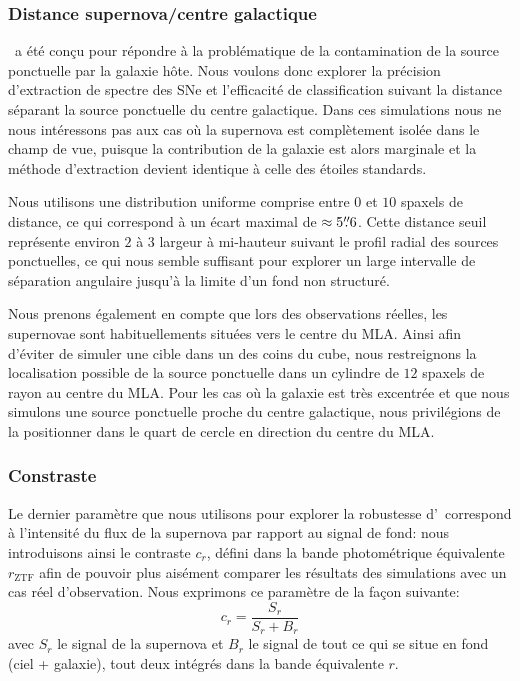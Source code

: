 \documentclass[../main/main.tex]{subfiles}
\begin{document}
\subsubsection{Distance supernova/centre galactique}\label{ssec:distancesimu}

\hypergal\ a été conçu pour répondre à la problématique de la
contamination de la source ponctuelle par la galaxie hôte. Nous voulons donc explorer la
précision d'extraction de spectre des SNe et l'efficacité de
classification suivant la distance séparant la source ponctuelle du
centre galactique. Dans ces simulations nous ne nous intéressons pas aux
cas où la supernova est complètement isolée dans le champ de vue,
puisque la contribution de la galaxie est alors marginale et
la méthode d'extraction devient identique à celle des étoiles standards.

Nous utilisons une distribution uniforme comprise entre $0$ et $10$
spaxels de distance, ce qui correspond à un écart maximal de
$\approx5\overset{\prime\prime}{.}6$. Cette distance seuil représente environ $2$ à $3$ largeur à
mi-hauteur suivant le profil radial des sources ponctuelles, ce qui nous
semble suffisant pour explorer un large intervalle de séparation
angulaire jusqu'à la limite d'un fond non structuré. 

Nous prenons également en compte que lors des observations réelles, les
supernovae sont habituellements situées vers le centre du MLA. Ainsi
afin d'éviter de simuler une cible dans un des coins du cube, nous
restreignons la localisation possible de la source ponctuelle dans un
cylindre de $12$ spaxels de rayon au centre du MLA. Pour les cas où la
galaxie est très excentrée et que nous simulons une source ponctuelle
proche du centre galactique, nous privilégions de la positionner dans le
quart de cercle en direction du centre du MLA. 

\subsubsection{Constraste}

Le dernier paramètre que nous utilisons pour explorer la robustesse
d'\hypergal\ correspond à l'intensité du flux de la supernova par
rapport au signal de fond: nous introduisons ainsi le
contraste $c_{r}$, défini dans la bande photométrique équivalente $r_{\text{ZTF}}$
afin de pouvoir plus aisément comparer les résultats des simulations
avec un cas réel d'observation. Nous exprimons ce paramètre de la façon suivante:
\begin{equation}
  \label{eq:contrast}
  c_{r} = \frac{S_{r}}{S_{r}+B_{r}}
\end{equation}
avec $S_{r}$ le signal de la supernova et $B_{r}$ le signal de tout ce qui se
situe en fond (ciel + galaxie), tout deux intégrés dans la bande
équivalente $r$.
\end{document}
